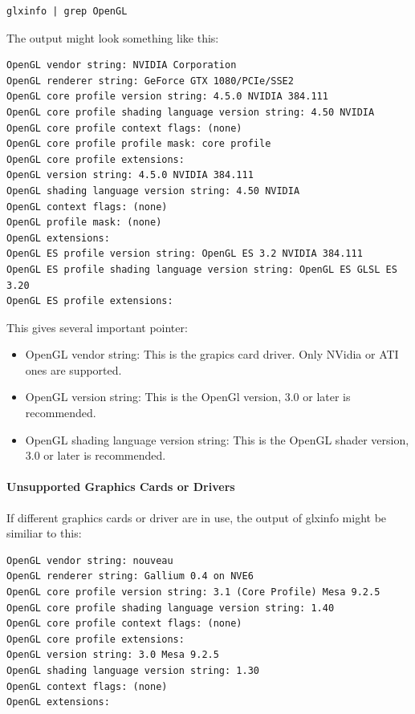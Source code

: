 \begin{verbatim}
glxinfo | grep OpenGL
\end{verbatim}

The output might look something like this:

\begin{verbatim}
OpenGL vendor string: NVIDIA Corporation
OpenGL renderer string: GeForce GTX 1080/PCIe/SSE2
OpenGL core profile version string: 4.5.0 NVIDIA 384.111
OpenGL core profile shading language version string: 4.50 NVIDIA
OpenGL core profile context flags: (none)
OpenGL core profile profile mask: core profile
OpenGL core profile extensions:
OpenGL version string: 4.5.0 NVIDIA 384.111
OpenGL shading language version string: 4.50 NVIDIA
OpenGL context flags: (none)
OpenGL profile mask: (none)
OpenGL extensions:
OpenGL ES profile version string: OpenGL ES 3.2 NVIDIA 384.111
OpenGL ES profile shading language version string: OpenGL ES GLSL ES 3.20
OpenGL ES profile extensions:
\end{verbatim}

This gives several important pointer:

\begin{itemize}  
\item OpenGL vendor string: This is the grapics card driver. Only NVidia or ATI ones are supported.
\item OpenGL version string: This is the OpenGl version, 3.0 or later is recommended.
\item OpenGL shading language version string: This is the OpenGL shader version, 3.0 or later is recommended.
\end{itemize}

\paragraph{Unsupported Graphics Cards or Drivers}

If different graphics cards or driver are in use, the output of glxinfo might be similiar to this:

\begin{verbatim}
OpenGL vendor string: nouveau
OpenGL renderer string: Gallium 0.4 on NVE6
OpenGL core profile version string: 3.1 (Core Profile) Mesa 9.2.5
OpenGL core profile shading language version string: 1.40
OpenGL core profile context flags: (none)
OpenGL core profile extensions:
OpenGL version string: 3.0 Mesa 9.2.5
OpenGL shading language version string: 1.30
OpenGL context flags: (none)
OpenGL extensions:
\end{verbatim}


